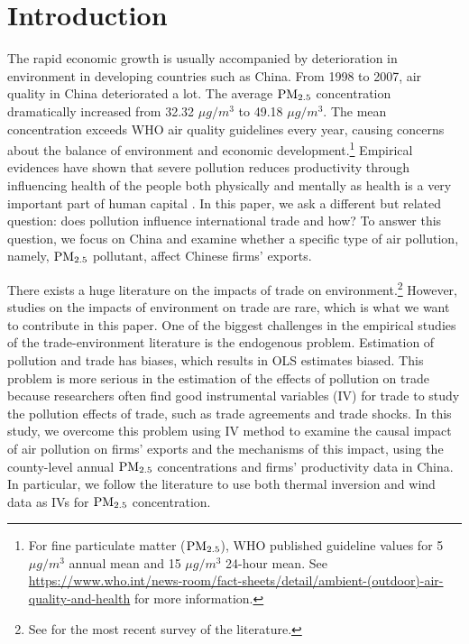 \documentclass[12pt]{article}
\begin{document}
\section{Introduction} \label{sec:1}
The rapid economic growth is usually accompanied by deterioration in environment in developing countries such as China. From 1998 to 2007, air quality in China deteriorated a lot. The average $\rm PM_{2.5}$ concentration dramatically increased from 32.32 $\mu g/m^3$ to 49.18 $\mu g/m^3$. The mean concentration exceeds WHO air quality guidelines every year, causing concerns about the balance of environment and economic development.\footnote{For fine particulate matter ($\rm PM_{2.5}$), WHO published guideline values for 5 $\mu g/m^3$ annual mean and 15 $\mu g/m^3$ 24-hour mean. See \url{https://www.who.int/news-room/fact-sheets/detail/ambient-(outdoor)-air-quality-and-health} for more information.} Empirical evidences have shown that severe pollution reduces productivity through influencing health of the people both physically and mentally as health is a very important part of human capital \citep{graff2012impact,chang2016particulate,zhang2018impact,fu2021air,somanathan2021impact,Adhvaryu2022}. In this paper, we ask a different but related question: does pollution influence international trade and how? To answer this question, we focus on China and examine whether a
specific type of air pollution, namely, $\rm PM_{2.5}$ pollutant, affect Chinese firms' exports.

There exists a huge literature on the impacts of trade on environment.\footnote{%
See \cite{cherniwchan2017trade} for the most recent survey of the literature.} However, studies on the impacts of environment on trade are rare, which is what we want to contribute in this paper. One of the biggest challenges in the empirical studies of the trade-environment literature is the endogenous
problem. Estimation of pollution and trade has biases, which results in OLS estimates biased. This problem is more serious in the estimation of the effects of pollution on trade because researchers often find good instrumental variables (IV) for trade to study the pollution effects of trade, such as trade agreements and trade shocks. In this study, we overcome this problem using IV method to examine the causal impact of air pollution on firms' exports and the mechanisms of this impact, using the
county-level annual $\rm PM_{2.5}$ concentrations and firms' productivity data in China. In particular, we follow the literature \citep{fu2021air, khanna2021productivity, chen2022effect} to use both thermal inversion and wind data as IVs for $\rm PM_{2.5}$ concentration.
\end{document}
